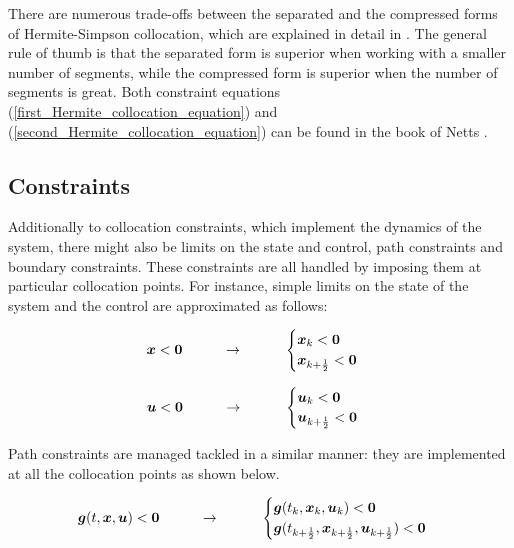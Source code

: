\documentclass{thesisreport}
\begin{document}
  There are numerous trade-offs between the separated and the compressed forms of Hermite-Simpson collocation, which are explained in detail in \cite{Betts2010}. The general rule of thumb is that the separated form is superior when working with a smaller number of segments, while the compressed form is superior when the number of segments is great. Both constraint equations (\ref{first_Hermite_collocation_equation})
and (\ref{second_Hermite_collocation_equation})  can be found in the book of Netts \cite{Betts2010}. 



\subsection{Constraints}


Additionally to collocation constraints, which implement the dynamics of the system, there might also be limits on the state and control, path constraints and boundary constraints. These constraints are all handled by imposing them at particular collocation points. For instance, simple limits on the state of the system and the control are approximated as follows:

\begin{equation}
\bm{x}<\bm{0} \text{\hspace{1cm}}\rightarrow  \text{\hspace{1cm}} \begin{cases}
\bm{x}_k <\bm{0} \\
\bm{x}_{k+\frac{1}{2}}<\bm{0}
\end{cases}
\end{equation}

\begin{equation}
\bm{u}<\bm{0} \text{\hspace{1cm}}\rightarrow  \text{\hspace{1cm}} \begin{cases}
\bm{u}_k <\bm{0} \\
\bm{u}_{k+\frac{1}{2}}<\bm{0}
\end{cases}
\end{equation}

\noindent Path constraints are managed tackled in a similar manner: they are implemented at all the collocation points as shown below.


\begin{equation}
\bm{g}(t,\bm{x},\bm{u}) < \bm{0} \text{\hspace{1cm}} \rightarrow \text{\hspace{1cm}} \begin{cases}
\bm{g}(t_k, \bm{x}_k,\bm{u}_k) < \bm{0} \\
\bm{g}(t_{k+\frac{1}{2}}, \bm{x}_{k+\frac{1}{2}},\bm{u}_{k+ \frac{1}{2}}) < \bm{0} \\
\end{cases}
\end{equation}
\end{document}
